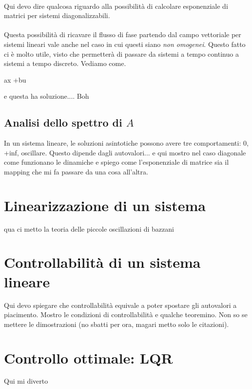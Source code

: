 \paragraph{}
 Qui devo dire qualcosa riguardo alla possibilità di calcolare
esponenziale di matrici per sistemi diagonalizzabili.


\paragraph{}
Questa possibilità di ricavare il flusso di fase partendo dal campo vettoriale per
sistemi lineari vale anche nel caso in cui questi siano \emph{non omogenei}.
Questo fatto ci è molto utile, visto che permetterà di passare da sistemi a tempo
continuo a sistemi a tempo discreto. Vediamo come.

\begin{definition}
    ax +bu
    \label{def:sistema-lineare}
\end{definition}

e questa ha soluzione.... Boh


\subsection{Analisi dello spettro di $A$}
In un sistema lineare, le soluzioni asintotiche possono avere tre comportamenti:
0, +inf, oscillare. Questo dipende dagli autovalori...
e qui mostro nel caso diagonale come funzionano le dinamiche e spiego come l'esponenziale
di matrice sia il mapping che mi fa passare da una cosa all'altra.

\section{Linearizzazione di un sistema}
qua ci metto la teoria delle piccole oscillazioni di bazzani

\section{Controllabilità di un sistema lineare}
Qui devo spiegare che controllabilità equivale a poter spostare gli autovalori a piacimento.
Mostro le condizioni di controllabilità e qualche teoremino. Non so se mettere le
dimostrazioni (no sbatti per ora, magari metto solo le citazioni).

\section{Controllo ottimale: LQR} 
Qui mi diverto